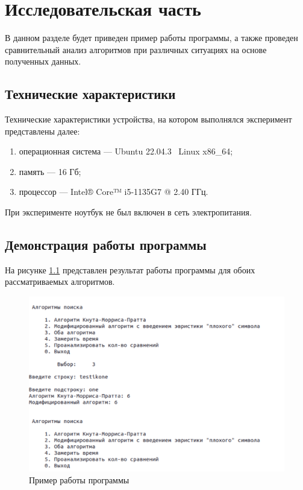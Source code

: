 \chapter{Исследовательская часть}

В данном разделе будет приведен пример работы программы, а также проведен сравнительный анализ алгоритмов при различных ситуациях на основе полученных данных.

\section{Технические характеристики}

Технические характеристики устройства, на котором выполнялся эксперимент представлены далее:

\begin{enumerate}[label=\arabic*)]
	\item операционная система --- Ubuntu 22.04.3~\cite{ubuntu} Linux x86\_64;
	\item память --- 16 Гб;
	\item процессор --- Intel® Core™ i5-1135G7 @ 2.40 ГГц.
\end{enumerate}

При эксперименте ноутбук не был включен в сеть электропитания.

\section{Демонстрация работы программы}

На рисунке \ref{fig:example} представлен результат работы программы для обоих рассматриваемых алгоритмов.
\clearpage

\begin{figure}[h!]
	\centering
	\includegraphics[width=0.9\linewidth]{img/example}
	\caption{Пример работы программы}
	\label{fig:example}
\end{figure}


